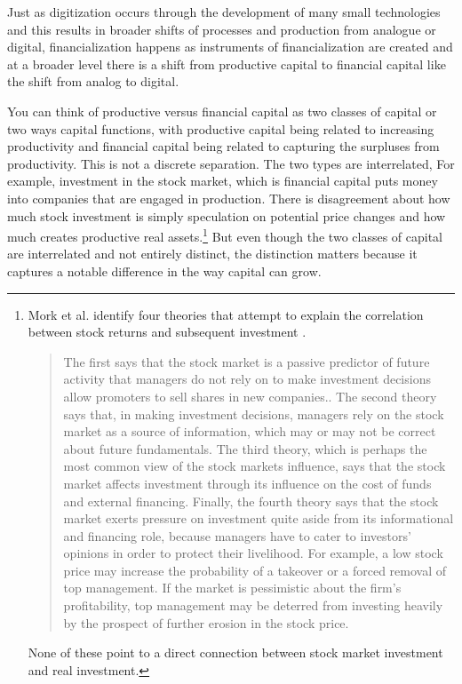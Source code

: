 Just as digitization occurs through the development of many small technologies and this results in %
broader shifts of processes and production from analogue or digital, financialization happens as instruments of financialization are created and at a broader level there is a shift from productive capital to financial capital like the shift from analog to digital. 

You can think of productive versus financial capital as two classes of capital or two ways capital functions, with productive capital being related to increasing productivity and financial capital being related to capturing the surpluses from productivity. This is not a discrete separation. The two types are interrelated, For example, investment in the stock market, which is financial capital puts money into companies that are engaged in production. There is disagreement about how much stock investment is simply speculation on potential price changes and how much creates productive real assets.\footnote{Mork et al. identify four theories that attempt to explain the correlation between stock returns and subsequent investment \cite{morckStockMarketInvestment1990}. \begin{quotation}The first says that the stock market is a passive predictor of future activity that managers do not rely on to make investment decisions allow promoters to sell shares in new companies.. The second theory says that, in making investment decisions, managers rely on the stock market as a source of information, which may or may not be correct about future fundamentals. The third theory, which is perhaps the most common view of the stock markets influence, says that the stock market affects investment through its influence on the cost of funds and external financing. Finally, the fourth theory says that the stock market exerts pressure on investment quite aside from its informational and financing role, because managers have to cater to investors' opinions in order to protect their livelihood. For example, a low stock price may increase the probability of a takeover or a forced removal of top management. If the market is pessimistic about the firm's profitability, top management may be deterred from investing heavily by the prospect of further erosion in the stock price.\end{quotation} None of these point to a direct connection between stock market investment and real investment.}  {\color{red} But even though the two classes of capital are interrelated and not entirely distinct, the distinction matters because it captures a notable difference in the way capital can grow.} 

